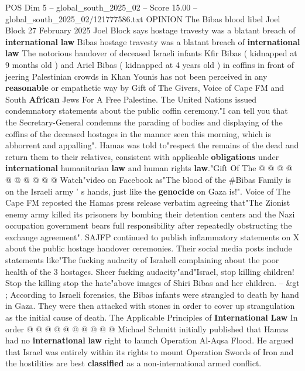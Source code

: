 \begin{textsample}{POS Dim 5 – global\_south\_2025\_02 – Score 15.00 – global\_south\_2025\_02/121777586.txt}  \label{ex:f5_pos_219}
OPINION The Bibas blood libel Joel Block 27 February 2025 Joel Block says hostage travesty was a blatant breach of \textbf{international} \textbf{law} Bibas hostage travesty was a blatant breach of \textbf{international} \textbf{law} The notorious handover of deceased Israeli infants Kfir Bibas ( kidnapped at 9 months old ) and Ariel Bibas ( kidnapped at 4 years old ) in coffins in front of jeering Palestinian crowds in Khan Younis has not been perceived in any \textbf{reasonable} or empathetic way by Gift of The Givers, Voice of Cape FM and South \textbf{African} Jews For A Free Palestine.
The United Nations issued condemnatory statements about the public coffin ceremony."I can tell you that the Secretary-General condemns the parading of bodies and displaying of the coffins of the deceased hostages in the manner seen this morning, which is abhorrent and appalling".
Hamas was told to"respect the remains of the dead and return them to their relatives, consistent with applicable \textbf{obligations} under \textbf{international} humanitarian \textbf{law} and human rights \textbf{law}."Gift Of The @ @ @ @ @ @ @ @ @ @ Watch"video on Facebook as"The blood of the \#Bibas Family is on the Israeli army ' s hands, just like the \textbf{genocide} on Gaza is!".
Voice of The Cape FM reposted the Hamas press release verbatim agreeing that"The Zionist enemy army killed its prisoners by bombing their detention centers and the Nazi occupation government bears full responsibility after repeatedly obstructing the exchange agreement".
SAJFP continued to publish inflammatory statements on X about the public hostage handover ceremonies.
Their social media posts include statements like"The fucking audacity of Israhell complaining about the poor health of the 3 hostages.
Sheer fucking audacity"and"Israel, stop killing children!
Stop the killing stop the hate"above images of Shiri Bibas and her children. -- \&gt ; According to Israeli forensics, the Bibas infants were strangled to death by hand in Gaza.
They were then attacked with stones in order to cover up strangulation as the initial cause of death.
The Applicable Principles of \textbf{International} \textbf{Law} In order @ @ @ @ @ @ @ @ @ @ Michael Schmitt initially published that Hamas had no \textbf{international} \textbf{law} right to launch Operation Al-Aqsa Flood.
He argued that Israel was entirely within its rights to mount Operation Swords of Iron and the hostilities are best \textbf{classified} as a non-international armed conflict.

\end{textsample}
